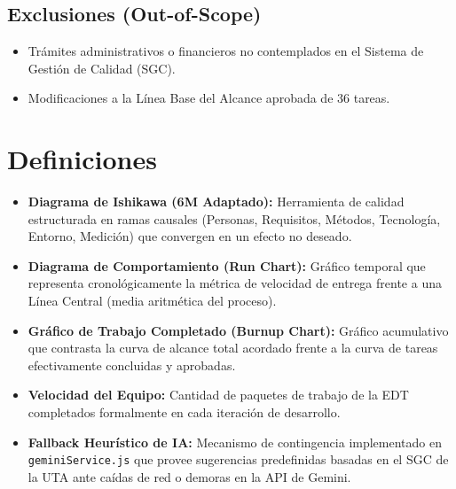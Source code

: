 \documentclass[12pt,a4paper]{article}
\begin{document}
\subsection{Exclusiones (Out-of-Scope)}
\begin{itemize}[leftmargin=1.5em, itemsep=1.5pt]
    \item Trámites administrativos o financieros no contemplados en el Sistema de Gestión de Calidad (SGC).
    \item Modificaciones a la Línea Base del Alcance aprobada de 36 tareas.
\end{itemize}

\section{Definiciones}
\begin{itemize}[leftmargin=1.5em, itemsep=2pt]
    \item \textbf{Diagrama de Ishikawa (6M Adaptado):} Herramienta de calidad estructurada en ramas causales (Personas, Requisitos, Métodos, Tecnología, Entorno, Medición) que convergen en un efecto no deseado.
    \item \textbf{Diagrama de Comportamiento (Run Chart):} Gráfico temporal que representa cronológicamente la métrica de velocidad de entrega frente a una Línea Central (media aritmética del proceso).
    \item \textbf{Gráfico de Trabajo Completado (Burnup Chart):} Gráfico acumulativo que contrasta la curva de alcance total acordado frente a la curva de tareas efectivamente concluidas y aprobadas.
    \item \textbf{Velocidad del Equipo:} Cantidad de paquetes de trabajo de la EDT completados formalmente en cada iteración de desarrollo.
    \item \textbf{Fallback Heurístico de IA:} Mecanismo de contingencia implementado en \texttt{geminiService.js} que provee sugerencias predefinidas basadas en el SGC de la UTA ante caídas de red o demoras en la API de Gemini.
\end{itemize}
\end{document}
